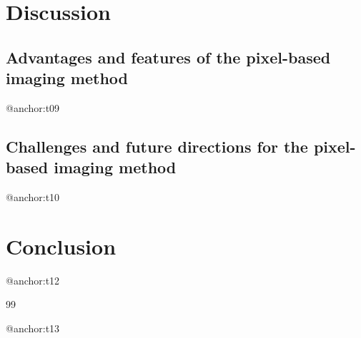 \documentclass[]{acoust}
\begin{document}
\section{Discussion}
\label{sec:discussion}

\subsection{Advantages and features of the pixel-based imaging method}
@anchor:t09

\subsection{Challenges and future directions for the pixel-based imaging method}
@anchor:t10

\section{Conclusion}
\label{sec:conclusion}

@anchor:t12

\begin{thebibliography}{99} 

@anchor:t13
\end{thebibliography}

\end{document}

